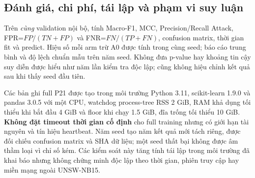 \subsection{Đánh giá, chi phí, tái lập và phạm vi suy luận}
Trên \emph{cùng} validation nội bộ, tính Macro-F1, MCC, Precision/Recall Attack, FPR=$FP/(TN+FP)$ và FNR=$FN/(TP+FN)$, confusion matrix, thời gian fit và predict. Hiệu số mỗi arm trừ A0 được tính trong cùng seed; báo cáo trung bình và độ lệch chuẩn mẫu trên năm seed. Không đưa p-value hay khoảng tin cậy suy diễn được hiểu như năm lần kiểm tra độc lập; cũng không hiệu chỉnh kết quả sau khi thấy seed đầu tiên.

Các bản ghi full P21 được tạo trong môi trường Python 3.11, scikit-learn 1.9.0 và pandas 3.0.5 với một CPU, watchdog process-tree RSS 2 GiB, RAM khả dụng tối thiểu khi bắt đầu 4 GiB và floor khi chạy 1.5 GiB, đĩa trống tối thiểu 10 GiB. \textbf{Không đặt timeout thời gian cố định} cho full training nhưng có giới hạn tài nguyên và tín hiệu heartbeat. Năm seed tạo năm kết quả mới tách riêng, được đối chiếu confusion matrix và SHA dữ liệu; một seed thất bại không được âm thầm loại vì chỉ số kém. Các kiểm soát này tăng tính tái lập trong môi trường đã khai báo nhưng không chứng minh độc lập theo thời gian, phiên truy cập hay miền mạng ngoài UNSW-NB15.
